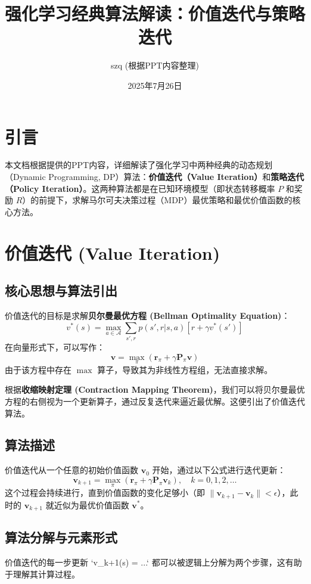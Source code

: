 \documentclass[12pt, a4paper]{article}
\title{\textbf{强化学习经典算法解读：价值迭代与策略迭代}}
\author{szq (根据PPT内容整理)}
\date{2025年7月26日}
\newcommand{\vect}[1]{\mathbf{#1}} %
\begin{document}
\maketitle
\tableofcontents
\newpage

\section{引言}
本文档根据提供的PPT内容，详细解读了强化学习中两种经典的动态规划（Dynamic Programming, DP）算法：\textbf{价值迭代（Value Iteration）}和\textbf{策略迭代（Policy Iteration）}。这两种算法都是在已知环境模型（即状态转移概率 $P$ 和奖励 $R$）的前提下，求解马尔可夫决策过程（MDP）最优策略和最优价值函数的核心方法。

\section{价值迭代 (Value Iteration)}

\subsection{核心思想与算法引出}
价值迭代的目标是求解\textbf{贝尔曼最优方程 (Bellman Optimality Equation)}：
\[
v^*(s) = \max_{a \in \mathcal{A}} \sum_{s', r} p(s', r | s, a) [r + \gamma v^*(s')]
\]
在向量形式下，可以写作：
\[
\vect{v} = \max_{\pi} (\vect{r}_{\pi} + \gamma \vect{P}_{\pi} \vect{v})
\]
由于该方程中存在 $\max$ 算子，导致其为非线性方程组，无法直接求解。

根据\textbf{收缩映射定理 (Contraction Mapping Theorem)}，我们可以将贝尔曼最优方程的右侧视为一个更新算子，通过反复迭代来逼近最优解。这便引出了价值迭代算法。

\subsection{算法描述}
价值迭代从一个任意的初始价值函数 $\vect{v}_0$ 开始，通过以下公式进行迭代更新：
\[
\vect{v}_{k+1} = \max_{\pi} (\vect{r}_{\pi} + \gamma \vect{P}_{\pi} \vect{v}_k), \quad k=0, 1, 2, \dots
\]
这个过程会持续进行，直到价值函数的变化足够小（即 $\lVert \vect{v}_{k+1} - \vect{v}_k \rVert < \epsilon$），此时的 $\vect{v}_{k+1}$ 就近似为最优价值函数 $\vect{v}^*$。

\subsection{算法分解与元素形式}
价值迭代的每一步更新 `v_{k+1}(s) = ...` 都可以被逻辑上分解为两个步骤，这有助于理解其计算过程。
\end{document}
